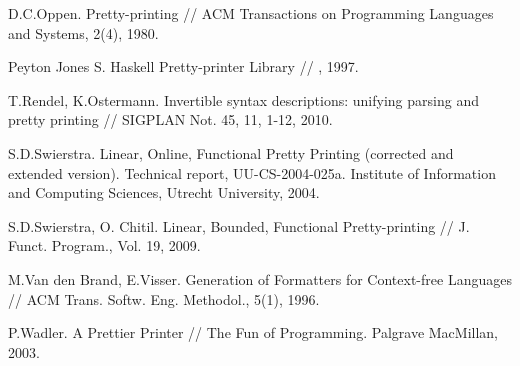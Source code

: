 \begin{thebibliography}{9001}
 D.C.Oppen. Pretty-printing // ACM Transactions on Programming Languages and Systems, 2(4), 1980.

 Peyton Jones S. Haskell Pretty-printer Library // , 1997.

 T.Rendel, K.Ostermann. Invertible syntax descriptions: unifying parsing and pretty printing // SIGPLAN Not. 45, 11, 1-12, 2010.

 S.D.Swierstra. Linear, Online, Functional Pretty Printing (corrected and extended version).
Technical report, UU-CS-2004-025a. Institute of Information and Computing Sciences, Utrecht University, 2004.

 S.D.Swierstra, O. Chitil. Linear, Bounded, Functional Pretty-printing // J. Funct. Program., Vol. 19,
2009.

 M.Van den Brand, E.Visser. Generation of Formatters for Context-free Languages // ACM Trans. Softw. Eng. Methodol., 5(1), 1996.

 P.Wadler. A Prettier Printer // The Fun of Programming. Palgrave MacMillan, 2003.


\end{thebibliography}
